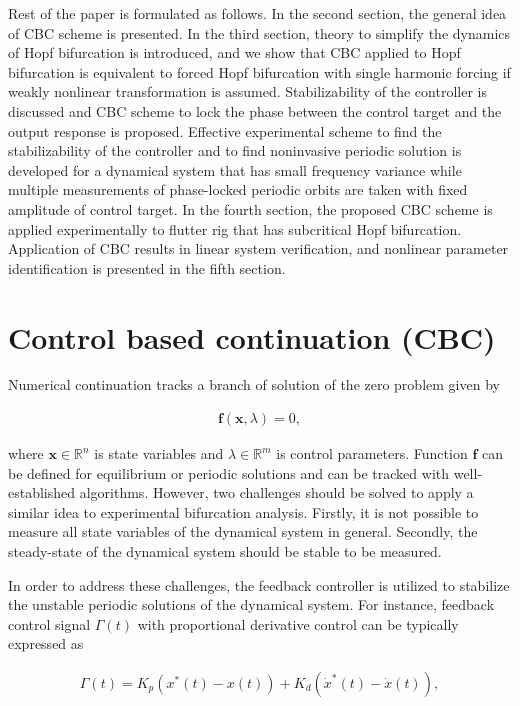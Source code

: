 \documentclass[openacc]{rsproca_new}%
\def\real{\mathbb{R}}
\def\vec#1{\ensuremath{\mathbf{#1}}}
\begin{document}
Rest of the paper is formulated as follows. In the second section, the general idea of CBC scheme is presented. In the third section, theory to simplify the dynamics of Hopf bifurcation is introduced, and we show that CBC applied to Hopf bifurcation is equivalent to forced Hopf bifurcation with single harmonic forcing if weakly nonlinear transformation is assumed. Stabilizability of the controller is discussed and CBC scheme to lock the phase between the control target and the output response is proposed. Effective experimental scheme to find the stabilizability of the controller and to find noninvasive periodic solution is developed for a dynamical system that has small frequency variance while multiple measurements of phase-locked periodic orbits are taken with fixed amplitude of control target. In the fourth section, the proposed CBC scheme is applied experimentally to flutter rig that has subcritical Hopf bifurcation. Application of CBC results in linear system verification, and nonlinear parameter identification is presented in the fifth section.


\section{Control based continuation (CBC)}\label{CBC}

Numerical continuation tracks a branch of solution of the zero problem given by

\begin{align} \label{eq:nc}
  \vec{f}(\vec{x},\lambda)=0,
\end{align}

\noindent where $\vec{x}\in \real ^n$ is state variables and $\lambda \in \real ^m$ is control parameters. Function $\vec f$ can be defined for equilibrium or periodic solutions and can be tracked with well-established algorithms. However, two challenges should be solved to apply a similar idea to experimental bifurcation analysis. Firstly, it is not possible to measure all state variables of the dynamical system in general. Secondly, the steady-state of the dynamical system should be stable to be measured.

In order to address these challenges, the feedback controller is utilized to stabilize the unstable periodic solutions of the dynamical system.
For instance, feedback control signal $\Gamma(t)$ with proportional derivative control can be typically expressed as

\begin{align}
  \Gamma(t)=K_p(x^*(t)-x(t))+K_d(\dot x^*(t)-\dot x(t)),
\end{align}
\end{document}

